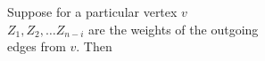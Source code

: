 \documentclass[preview]{standalone}
\begin{document}
\begin{center}
Suppose for a particular vertex $v$\\
$Z_1, Z_2, \ldots Z_{n - i}$ are the weights of the outgoing\\
edges from $v$. Then
\end{center}
\end{document}
